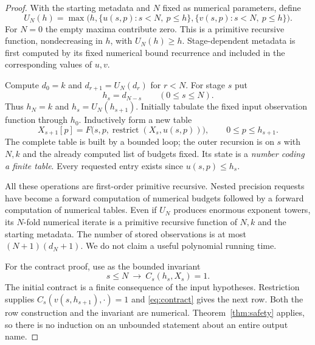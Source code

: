 \begin{proof}
With the starting metadata and $N$ fixed as numerical parameters, define
\[
 U_N(h)=\max\bigl( h,\{u(s,p):s<N,\ p\le h\},
                         \{v(s,p):s<N,\ p\le h\}\bigr).
\]
For $N=0$ the empty maxima contribute zero. This is a primitive recursive
function, nondecreasing in $h$, with $U_N(h)\ge h$. Stage-dependent metadata
is first computed by its fixed numerical bound recurrence and included in
the corresponding values of $u,v$.

Compute $d_0=k$ and $d_{r+1}=U_N(d_r)$ for $r<N$. For stage $s$ put
\begin{equation}
 h_s=d_{N-s}\qquad(0\le s\le N).               \label{eq:budgets}
\end{equation}
Thus $h_N=k$ and $h_s=U_N(h_{s+1})$. Initially tabulate the fixed input
observation function through $h_0$. Inductively form a new table
\begin{equation}
 X_{s+1}[p]=F\bigl(s,p,
          \operatorname{restrict}(X_s,u(s,p))\bigr),
 \qquad 0\le p\le h_{s+1}.                   \label{eq:table-build}
\end{equation}
The complete table is built by a bounded loop; the outer recursion is on
$s$ with $N,k$ and the already computed list of budgets fixed. Its state
is a \emph{number coding a finite table}. Every requested entry exists
since $u(s,p)\le h_s$.

All these operations are first-order primitive recursive. Nested
precision requests have become a forward computation of numerical
budgets followed by a forward computation of numerical tables. Even if
$U_N$ produces enormous exponent towers, its $N$-fold numerical iterate
is a primitive recursive function of $N,k$ and the starting metadata.
The number of stored observations is at most
$(N+1)(d_N+1)$. We do not claim a useful polynomial running time.

For the contract proof, use as the bounded invariant
\[
 s\le N\ \longrightarrow\ C_s(h_s,X_s)=1.
\]
The initial contract is a finite consequence of the input hypotheses.
Restriction supplies $C_s(v(s,h_{s+1}),\cdot)=1$ and
\eqref{eq:contract} gives the next row. Both the row construction and the
invariant are numerical. Theorem~\ref{thm:safety} applies, so there is
no induction on an unbounded statement about an entire output name.
\end{proof}

